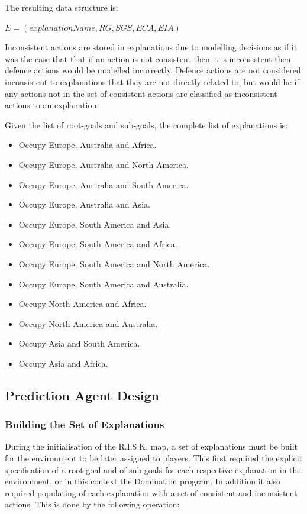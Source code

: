 \documentclass[parskip]{cs4rep}
\begin{document}
The resulting data structure is:\newline

\centerline{
$E = ( explanationName, RG, SGS, ECA, EIA )$
}

Inconsistent actions are stored in explanations due to modelling decisions as if it was the case that that if an action is not consistent then it is inconsistent then defence actions would be modelled incorrectly. Defence actions are not considered inconsistent to explanations that they are not directly related to, but would be if any actions not in the set of consistent actions are classified as inconsistent actions to an explanation.

Given the list of root-goals and sub-goals, the complete list of explanations is:

\begin{itemize}
\item
Occupy Europe, Australia and Africa.
\item
Occupy Europe, Australia and North America.
\item
Occupy Europe, Australia and South America.
\item
Occupy Europe, Australia and Asia.
\item
Occupy Europe, South America and Asia.
\item
Occupy Europe, South America and Africa.
\item
Occupy Europe, South America and North America.
\item
Occupy Europe, South America and Australia.
\item
Occupy North America and Africa.
\item
Occupy North America and Australia.
\item
Occupy Asia and South America.
\item
Occupy Asia and Africa.
\end{itemize}

\subsection{Prediction Agent Design}

\subsubsection{Building the Set of Explanations}

During the initialisation of the R.I.S.K. map, a set of explanations must be built for the environment to be later assigned to players. This first required the explicit specification of a root-goal and of sub-goals for each respective explanation in the environment, or in this context the Domination program. In addition it also required populating of each explanation with a set of consistent and inconsistent actions. This is done by the following operation:
\end{document}
